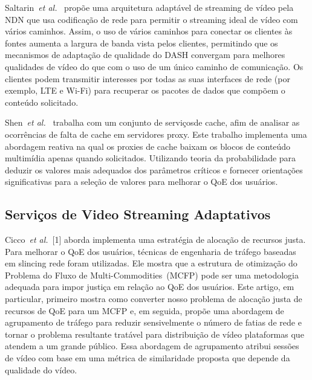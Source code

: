 Saltarin~\textit{et al.}~\cite{saltarinTrans2017} propõe uma arquitetura adaptável de streaming de vídeo pela NDN que usa codificação de rede para permitir o streaming ideal de vídeo com vários caminhos. Assim, o uso de vários caminhos para conectar os clientes às fontes aumenta a largura de banda vista pelos clientes, permitindo que os mecanismos de adaptação de qualidade do DASH convergam para melhores qualidades de vídeo do que com o uso de um único caminho de comunicação. Os clientes podem transmitir interesses por todas as suas interfaces de rede (por exemplo, LTE e Wi-Fi) para recuperar os pacotes de dados que compõem o conteúdo solicitado.

Shen~\textit{et al.}~\cite{shenIWQoS19} trabalha com um conjunto de serviçosde cache, afim de analisar as ocorrências de falta de cache em servidores proxy. Este trabalho implementa uma abordagem reativa na qual os proxies de cache baixam os blocos de conteúdo multimídia apenas quando solicitados. Utilizando teoria da probabilidade para deduzir os valores mais adequados dos parâmetros críticos e fornecer orientações significativas para a seleção de valores para melhorar o QoE dos usuários.

\subsection{Serviços de Video Streaming Adaptativos}

Cicco~\textit{et al.}~[1] aborda implementa uma estratégia de alocação de recursos justa. Para melhorar o QoE dos usuários, técnicas de engenharia de tráfego baseadas em slincing rede foram utilizadas. Ele mostra que a estrutura de otimização do Problema do Fluxo de Multi-Commodities~(MCFP) pode ser uma metodologia adequada para impor justiça em relação ao QoE dos usuários. Este artigo, em particular, primeiro mostra como converter nosso problema de alocação justa de recursos de QoE para um MCFP e, em seguida, propõe uma abordagem de agrupamento de tráfego para reduzir sensivelmente o número de fatias de rede e tornar o problema resultante tratável para distribuição de vídeo plataformas que atendem a um grande público. Essa abordagem de agrupamento atribui sessões de vídeo com base em uma métrica de similaridade proposta que depende da qualidade do vídeo.

